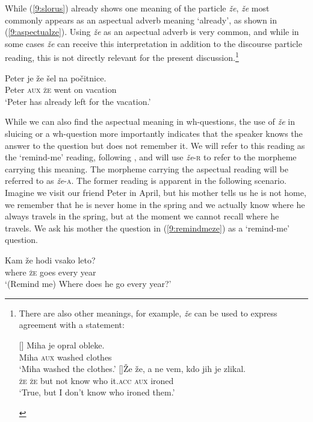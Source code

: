 \documentclass[output=paper,modfonts,newtxmath,hidelinks]{langscibook}
\begin{document}
\noindent While (\ref{9:slorus}) already shows one meaning of the particle \textit{že}, \textit{že} most commonly appears as an aspectual adverb meaning `already', as shown in (\ref{9:aspectualze}). Using \textit{že} as an aspectual adverb is very common, and while in some cases \textit{že} can receive this interpretation in addition to the discourse particle reading, this is not directly relevant for the present discussion.\footnote{There are also other meanings, for example, \textit{že} can be used to express agreement with a statement:

\ea
\begin{xlist}
[]{
\gll Miha je opral obleke.\\ 
Miha \textsc{aux} washed clothes\\
\glt `Miha washed the clothes.'}
[]{\gll Že že, a ne vem, kdo jih je zlikal.\\ 
\textsc{že} \textsc{že}	but not know who it.\textsc{acc} \textsc{aux} ironed\\
\glt `True, but I don't know who ironed them.'}
\end{xlist}
\zlast
}

\begin{exe} 
\ex \label{9:aspectualze}
\gll Peter 	je že šel na počitnice. \\
	Peter   \textsc{aux} \textsc{že} went on vacation\\
\trans `Peter has already left for the vacation.' 
\end{exe}

\noindent While we can also find the aspectual meaning in wh-questions, the use of \textit{že} in sluicing or a wh-question more importantly indicates that the speaker knows the answer to the question but does not remember it. We will refer to this reading as the `remind-me' reading, following \cite{sauerland2014wieder}, and will use \textit{že}-\textsc{r} to refer to the morpheme carrying this meaning. The morpheme carrying the aspectual reading will be referred to as \textit{že}-\textsc{a}. The former reading is apparent in the following scenario. Imagine we visit our friend Peter in April, but his mother tells us he is not home, we remember that he is never home in the spring and we actually know where he always travels in the spring, but at the moment we cannot recall where he travels. We ask his mother the question in (\ref{9:remindmeze}) as a `remind-me' question.

\begin{exe}
\ex \label{9:remindmeze}
\gll Kam že hodi vsako leto?\\
	where \textsc{že} goes every year\\
	\trans `(Remind me) Where does he go every year?'
\end{exe}
\end{document}
